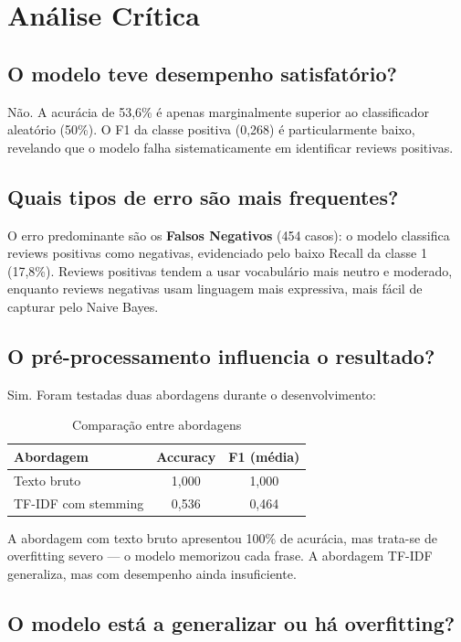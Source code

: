\documentclass[10pt,twocolumn]{article}
\begin{document}
\section{Análise Crítica}

\subsection{O modelo teve desempenho satisfatório?}

Não. A acurácia de 53,6\% é apenas marginalmente superior ao classificador aleatório (50\%). O F1 da classe positiva (0,268) é particularmente baixo, revelando que o modelo falha sistematicamente em identificar reviews positivas.

\subsection{Quais tipos de erro são mais frequentes?}

O erro predominante são os \textbf{Falsos Negativos} (454 casos): o modelo classifica reviews positivas como negativas, evidenciado pelo baixo Recall da classe 1 (17,8\%). Reviews positivas tendem a usar vocabulário mais neutro e moderado, enquanto reviews negativas usam linguagem mais expressiva, mais fácil de capturar pelo Naive Bayes.

\subsection{O pré-processamento influencia o resultado?}

Sim. Foram testadas duas abordagens durante o desenvolvimento:

\begin{table}[H]
\centering
\caption{Comparação entre abordagens}
\begin{tabular}{lcc}
\toprule
\textbf{Abordagem} & \textbf{Accuracy} & \textbf{F1 (média)} \\
\midrule
Texto bruto & 1,000 & 1,000 \\
TF-IDF com stemming & 0,536 & 0,464 \\
\bottomrule
\end{tabular}
\end{table}

A abordagem com texto bruto apresentou 100\% de acurácia, mas trata-se de overfitting severo --- o modelo memorizou cada frase. A abordagem TF-IDF generaliza, mas com desempenho ainda insuficiente.

\subsection{O modelo está a generalizar ou há overfitting?}
\end{document}
